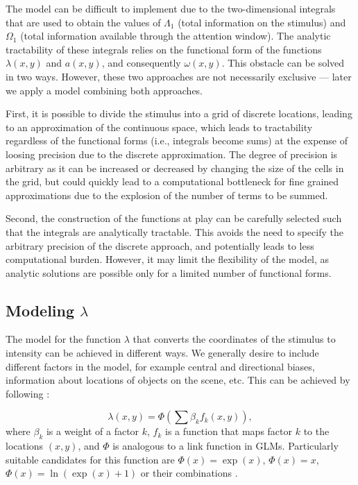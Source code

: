 \documentclass{article}
\begin{document}
The model can be difficult to implement due to the two-dimensional integrals that are used to obtain the values of $\Lambda_1$ (total information on the stimulus) and $\Omega_1$ (total information available through the attention window). The analytic tractability of these integrals relies on the functional form of the functions $\lambda(x, y)$ and $a(x, y)$, and consequently $\omega(x, y)$. This obstacle can be solved in two ways. However, these two approaches are not necessarily exclusive --- later we apply a model combining both approaches.

First, it is possible to divide the stimulus into a grid of discrete locations, leading to an approximation of the continuous space, which leads to tractability regardless of the functional forms (i.e., integrals become sums) at the expense of loosing precision due to the discrete approximation. The degree of precision is arbitrary as it can be increased or decreased by changing the size of the cells in the grid, but could quickly lead to a computational bottleneck for fine grained approximations due to the explosion of the number of terms to be summed.

Second, the construction of the functions at play can be carefully selected such that the integrals are analytically tractable. This avoids the need to specify the arbitrary precision of the discrete approach, and potentially leads to less computational burden. However, it may limit the flexibility of the model, as analytic solutions are possible only for a limited number of functional forms.


\subsection{Modeling \texorpdfstring{$\lambda$}{lambda}}

The model for the function $\lambda$ that converts the coordinates of the stimulus to intensity can be achieved in different ways. We generally desire to include different factors in the model, for example central and directional biases, information about locations of objects on the scene, etc. This can be achieved by following \citep{barthelme2013spatial}:

\begin{equation}
    \lambda(x, y) = \Phi \left(\sum \beta_k f_k(x, y) \right),
\end{equation}
where $\beta_k$ is a weight of a factor $k$, $f_k$ is a function that maps factor $k$ to the locations $(x, y)$, and $\Phi$ is analogous to a link function in GLMs. Particularly suitable candidates for this function are $\Phi (x) = \exp(x)$, $\Phi (x) = x$, $\Phi (x) = \ln(\exp(x) + 1)$ or their combinations \citep[see ][for the discussion of the differences between them]{barthelme2013spatial}. 
\end{document}
